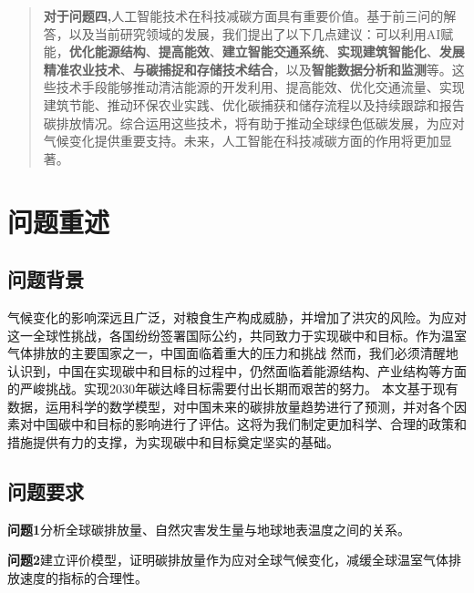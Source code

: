 \documentclass[withoutpreface,bwprint]{cumcmthesis}
\begin{document}
\begin{abstract}
\textbf{对于问题四,}人工智能技术在科技减碳方面具有重要价值。基于前三问的解答，以及当前研究领域的发展，我们提出了以下几点建议：可以利用AI赋能，\textbf{优化能源结构}、\textbf{提高能效}、\textbf{建立智能交通系统}、\textbf{实现建筑智能化}、\textbf{发展精准农业技术}、\textbf{与碳捕捉和存储技术结合}，以及\textbf{智能数据分析和监测}等。这些技术手段能够推动清洁能源的开发利用、提高能效、优化交通流量、实现建筑节能、推动环保农业实践、优化碳捕获和储存流程以及持续跟踪和报告碳排放情况。综合运用这些技术，将有助于推动全球绿色低碳发展，为应对气候变化提供重要支持。未来，人工智能在科技减碳方面的作用将更加显著。



\end{abstract}


\section{问题重述}
\subsection{问题背景}
气候变化的影响深远且广泛，对粮食生产构成威胁，并增加了洪灾的风险。为应对这一全球性挑战，各国纷纷签署国际公约，共同致力于实现碳中和目标。作为温室气体排放的主要国家之一，中国面临着重大的压力和挑战
然而，我们必须清醒地认识到，中国在实现碳中和目标的过程中，仍然面临着能源结构、产业结构等方面的严峻挑战。实现2030年碳达峰目标需要付出长期而艰苦的努力。
本文基于现有数据，运用科学的数学模型，对中国未来的碳排放量趋势进行了预测，并对各个因素对中国碳中和目标的影响进行了评估。这将为我们制定更加科学、合理的政策和措施提供有力的支撑，为实现碳中和目标奠定坚实的基础。


\subsection{问题要求}

\textbf{问题1}分析全球碳排放量、自然灾害发生量与地球地表温度之间的关系。  

\textbf{问题2}建立评价模型，证明碳排放量作为应对全球气候变化，减缓全球温室气体排放速度的指标的合理性。  
\end{document}
